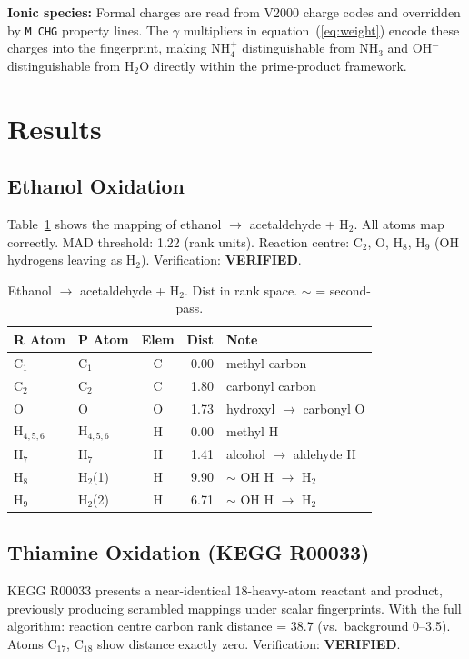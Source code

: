 \documentclass[12pt,a4paper]{article}
\begin{document}
\textbf{Ionic species:} Formal charges are read from V2000 charge codes
and overridden by \texttt{M~CHG} property lines. The $\gamma$ multipliers
in equation~(\ref{eq:weight}) encode these charges into the fingerprint,
making NH$_4^+$ distinguishable from NH$_3$ and OH$^-$ distinguishable
from H$_2$O directly within the prime-product framework.

\section{Results}

\subsection{Ethanol Oxidation}

Table~\ref{tab:ethanol} shows the mapping of ethanol $\to$ acetaldehyde
+ H$_2$. All atoms map correctly. MAD threshold: 1.22 (rank units).
Reaction centre: C$_2$, O, H$_8$, H$_9$ (OH hydrogens leaving as H$_2$).
Verification: \textbf{VERIFIED}.

\begin{table}[h]
\centering
\caption{Ethanol $\to$ acetaldehyde + H$_2$. Dist in rank space.
$\sim$ = second-pass.}
\label{tab:ethanol}
\begin{tabular}{llcrl}
\toprule
R Atom & P Atom & Elem & Dist & Note \\
\midrule
C$_1$ & C$_1$ & C & 0.00 & methyl carbon \\
C$_2$ & C$_2$ & C & 1.80 & carbonyl carbon \\
O     & O     & O & 1.73 & hydroxyl $\to$ carbonyl O \\
H$_{4,5,6}$ & H$_{4,5,6}$ & H & 0.00 & methyl H \\
H$_7$ & H$_7$ & H & 1.41 & alcohol $\to$ aldehyde H \\
H$_8$ & H$_2$(1) & H & 9.90 & $\sim$ OH H $\to$ H$_2$ \\
H$_9$ & H$_2$(2) & H & 6.71 & $\sim$ OH H $\to$ H$_2$ \\
\bottomrule
\end{tabular}
\end{table}

\subsection{Thiamine Oxidation (KEGG R00033)}

KEGG R00033 presents a near-identical 18-heavy-atom reactant and product,
previously producing scrambled mappings under scalar fingerprints.
With the full algorithm: reaction centre carbon rank distance = 38.7
(vs.\ background 0--3.5). Atoms C$_{17}$, C$_{18}$ show distance
exactly zero. Verification: \textbf{VERIFIED}.
\end{document}
